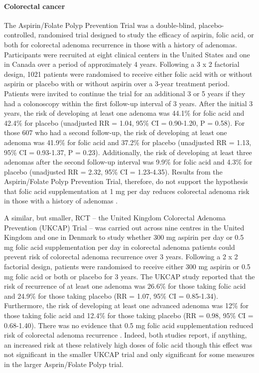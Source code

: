 \paragraph{Colorectal cancer} %
The Aspirin/Folate Polyp Prevention Trial was a double-blind, placebo-controlled, randomised trial designed to study the efficacy of aspirin, folic acid, or both for colorectal adenoma recurrence in those with a history of adenomas. Participants were recruited at eight clinical centers in the United States and one in Canada over a period of approximately 4 years. Following a 3 x 2 factorial design, 1021 patients were randomised to receive either folic acid with or without aspirin or placebo with or without aspirin over a 3-year treatment period. Patients were invited to continue the trial for an additional 3 or 5 years if they had a colonoscopy within the first follow-up interval of 3 years. After the initial 3 years, the risk of developing at least one adenoma was 44.1\% for folic acid and 42.4\% for placebo (unadjusted RR = 1.04, 95\% CI = 0.90-1.20, P = 0.58). For those 607 who had a second follow-up, the risk of developing at least one adenoma was 41.9\% for folic acid and 37.2\% for placebo (unadjusted RR = 1.13, 95\% CI = 0.93-1.37, P = 0.23). Additionally, the risk of developing at least three adenomas after the second follow-up interval was 9.9\% for folic acid and 4.3\% for placebo (unadjusted RR = 2.32, 95\% CI = 1.23-4.35). Results from the Aspirin/Folate Polyp Prevention Trial, therefore, do not support the hypothesis that folic acid supplementation at 1 mg per day reduces colorectal adenoma risk in those with a history of adenomas \cite{c238}. 
 
\noindent A similar, but smaller, RCT -- the United Kingdom Colorectal Adenoma Prevention (UKCAP) Trial -- was carried out across nine centres in the United Kingdom and one in Denmark to study whether 300 mg aspirin per day or 0.5 mg folic acid supplementation per day in colorectal adenoma patients could prevent risk of colorectal adenoma recurrence over 3 years. Following a 2 x 2 factorial design, patients were randomised to receive either 300 mg aspirin or 0.5 mg folic acid or both or placebo for 3 years. The UKCAP study reported that the risk of recurrence of at least one adenoma was 26.6\% for those taking folic acid and 24.9\% for those taking placebo (RR = 1.07, 95\% CI = 0.85-1.34). Furthermore, the risk of developing at least one advanced adenoma was 12\% for those taking folic acid and 12.4\% for those taking placebo (RR = 0.98, 95\% CI = 0.68-1.40). There was no evidence that 0.5 mg folic acid supplementation reduced risk of colorectal adenoma recurrence \cite{c239}. Indeed, both studies report, if anything, an increased risk at these relatively high doses of folic acid though this effect was not significant in the smaller UKCAP trial and only significant for some measures in the larger Asprin/Folate Polyp trial. 
 
